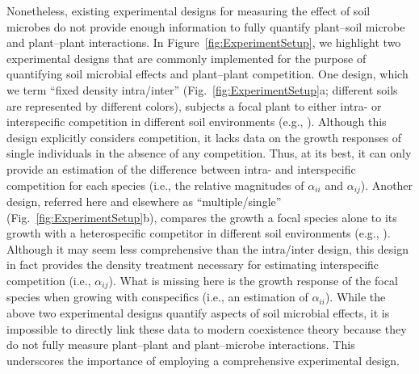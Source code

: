 Nonetheless, existing experimental designs for measuring the effect of soil microbes do not provide enough information to fully quantify plant--soil microbe and plant--plant interactions.
In Figure~\ref{fig:ExperimentSetup}, we highlight two experimental designs that are commonly implemented for the purpose of quantifying soil microbial effects and plant--plant competition.
One design, which we term ``fixed density intra/inter'' (Fig.~\ref{fig:ExperimentSetup}a; different soils are represented by different colors), subjects a focal plant to either intra- or interspecific competition in different soil environments (e.g., \citealt{Petermann2008}). Although this design explicitly considers competition, it lacks data on the growth responses of single individuals in the absence of any competition. Thus, at its best, it can only provide an estimation of the difference between intra- and interspecific competition for each species (i.e., the relative magnitudes of $\alpha_{ii}$ and $\alpha_{ij}$).
Another design, referred here and elsewhere as ``multiple/single''  (Fig.~\ref{fig:ExperimentSetup}b), compares the growth a focal species alone to its growth with a heterospecific competitor in different soil environments (e.g., \citealt{Shannon2012, Crawford2017}). Although it may seem less comprehensive than the intra/inter design, this design in fact provides the density treatment necessary for estimating interspecific competition (i.e., $\alpha_{ij}$). What is missing here is the growth response of the focal species when growing with conspecifics (i.e., an estimation of $\alpha_{ii}$).
While the above two experimental designs quantify aspects of soil microbial effects, it is impossible to directly link these data to modern coexistence theory because they do not fully measure plant--plant and plant--microbe interactions. This underscores the importance of employing a comprehensive experimental design.
\par


